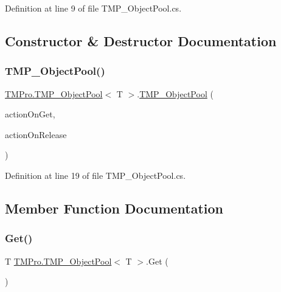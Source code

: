 Definition at line 9 of file T\+M\+P\+\_\+\+Object\+Pool.\+cs.



\subsection{Constructor \& Destructor Documentation}
\mbox{\label{class_t_m_pro_1_1_t_m_p___object_pool_abac083490dabbd73d8fd069b7992c18b}} 
\subsubsection{\texorpdfstring{TMP\_ObjectPool()}{TMP\_ObjectPool()}}
{\footnotesize\ttfamily \mbox{\hyperlink{class_t_m_pro_1_1_t_m_p___object_pool}{T\+M\+Pro.\+T\+M\+P\+\_\+\+Object\+Pool}}$<$ T $>$.\mbox{\hyperlink{class_t_m_pro_1_1_t_m_p___object_pool}{T\+M\+P\+\_\+\+Object\+Pool}} (\begin{DoxyParamCaption}\item[{Unity\+Action$<$ T $>$}]{action\+On\+Get,  }\item[{Unity\+Action$<$ T $>$}]{action\+On\+Release }\end{DoxyParamCaption})}



Definition at line 19 of file T\+M\+P\+\_\+\+Object\+Pool.\+cs.



\subsection{Member Function Documentation}
\mbox{\label{class_t_m_pro_1_1_t_m_p___object_pool_ac06efec7fc4061a729cfb6dfc0e66f82}} 
\subsubsection{\texorpdfstring{Get()}{Get()}}
{\footnotesize\ttfamily T \mbox{\hyperlink{class_t_m_pro_1_1_t_m_p___object_pool}{T\+M\+Pro.\+T\+M\+P\+\_\+\+Object\+Pool}}$<$ T $>$.Get (\begin{DoxyParamCaption}{ }\end{DoxyParamCaption})}



